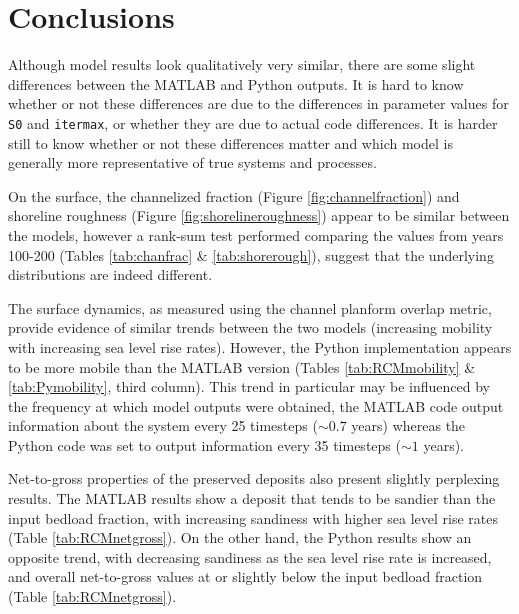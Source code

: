 
\section{Conclusions}
Although model results look qualitatively very similar, there are some slight differences between the MATLAB and Python outputs.
It is hard to know whether or not these differences are due to the differences in parameter values for \texttt{S0} and \texttt{itermax}, or whether they are due to actual code differences.
It is harder still to know whether or not these differences matter and which model is generally more representative of true systems and processes.

On the surface, the channelized fraction (Figure \ref{fig:channelfraction}) and shoreline roughness (Figure \ref{fig:shorelineroughness}) appear to be similar between the models, however a rank-sum test performed comparing the values from years 100-200 (Tables \ref{tab:chanfrac} \& \ref{tab:shorerough}), suggest that the underlying distributions are indeed different.

The surface dynamics, as measured using the channel planform overlap metric, provide evidence of similar trends between the two models (increasing mobility with increasing sea level rise rates).
However, the Python implementation appears to be more mobile than the MATLAB version (Tables \ref{tab:RCMmobility} \& \ref{tab:Pymobility}, third column).
This trend in particular may be influenced by the frequency at which model outputs were obtained, the MATLAB code output information about the system every 25 timesteps ($\sim0.7$ years) whereas the Python code was set to output information every 35 timesteps ($\sim1$ years).

Net-to-gross properties of the preserved deposits also present slightly perplexing results.
The MATLAB results show a deposit that tends to be sandier than the input bedload fraction, with increasing sandiness with higher sea level rise rates (Table \ref{tab:RCMnetgross}).
On the other hand, the Python results show an opposite trend, with decreasing sandiness as the sea level rise rate is increased, and overall net-to-gross values at or slightly below the input bedload fraction (Table \ref{tab:RCMnetgross}).

\clearpage

